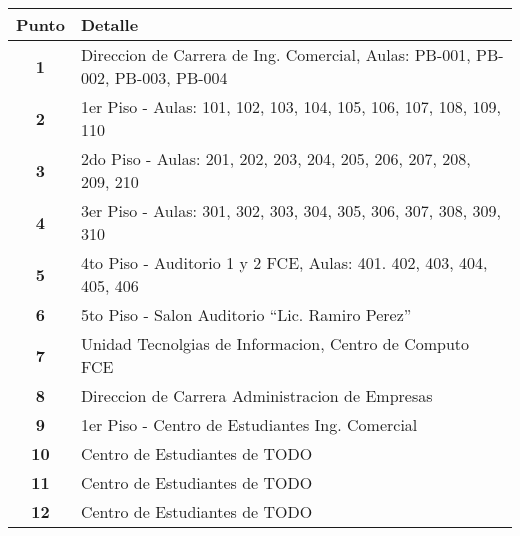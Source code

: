     \begin{longtable}{ c  X }
      \toprule
        \textbf{Punto} &
        \textbf{Detalle}\\

      \midrule
      \endhead

      \textbf{1}
      &
      Direccion de Carrera de Ing. Comercial, Aulas: PB-001, PB-002, PB-003, PB-004
      \\

      \textbf{2}
      &
      1{\tiny er} Piso - Aulas: 101, 102, 103, 104, 105, 106, 107, 108, 109, 110
      \\


      \textbf{3}
      &
      2{\tiny do} Piso - Aulas: 201, 202, 203, 204, 205, 206, 207, 208, 209, 210
      \\


      \textbf{4}
      &
      3{\tiny er} Piso - Aulas: 301, 302, 303, 304, 305, 306, 307, 308, 309, 310
      \\


      \textbf{5}
      &
      4{\tiny to} Piso - Auditorio 1 y 2 FCE, Aulas: 401. 402, 403, 404, 405, 406
      \\


      \textbf{6}
      &
      5{\tiny to} Piso - Salon Auditorio ``Lic. Ramiro Perez''
      \\



      \textbf{7}
      &
      Unidad Tecnolgias de Informacion, Centro de Computo FCE
      \\


      \textbf{8}
      &
      Direccion de Carrera Administracion de Empresas
      \\


      \textbf{9}
      &
       1{\tiny er} Piso - Centro de Estudiantes Ing. Comercial
      \\


      \textbf{10}
      &
      Centro de Estudiantes de TODO
      \\


      \textbf{11}
      &
      Centro de Estudiantes de TODO
      \\


      \textbf{12}
      &
      Centro de Estudiantes de TODO
      \\



\end{longtable}
